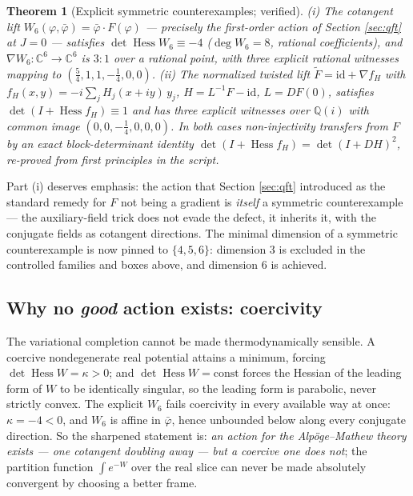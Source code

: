 \documentclass[11pt]{article}
\newtheorem{theorem}{Theorem}[section]
\theoremstyle{definition}
\theoremstyle{remark}
\newcommand{\C}{\mathbb{C}}
\newcommand{\Q}{\mathbb{Q}}
\begin{document}
\begin{theorem}[Explicit symmetric counterexamples; verified]
\label{thm:dim6}
\emph{(i)} The cotangent lift
$W_6(\varphi,\bar\varphi)=\bar\varphi\cdot F(\varphi)$ --- precisely
the first-order action of Section \ref{sec:qft} at $J=0$ --- satisfies
$\det\operatorname{Hess}W_6\equiv-4$ ($\deg W_6=8$, rational
coefficients), and $\nabla W_6:\C^6\to\C^6$ is $3{:}1$ over a rational
point, with three explicit rational witnesses mapping to
$(\tfrac54,1,1,-\tfrac14,0,0)$.
\emph{(ii)} The normalized twisted lift $\widetilde F=\mathrm{id}+\nabla
f_H$ with $f_H(x,y)=-i\sum_j H_j(x+iy)\,y_j$, $H=L^{-1}F-\mathrm{id}$,
$L=DF(0)$, satisfies $\det(I+\operatorname{Hess}f_H)\equiv1$ and has
three explicit witnesses over $\Q(i)$ with common image
$(0,0,-\tfrac14,0,0,0)$. In both cases non-injectivity transfers from
$F$ by an exact block-determinant identity
$\det(I+\operatorname{Hess}f_H)=\det(I+DH)^2$, re-proved from first
principles in the script.
\end{theorem}

Part (i) deserves emphasis: the action that Section \ref{sec:qft}
introduced as the standard remedy for $F$ not being a gradient is
\emph{itself} a symmetric counterexample --- the auxiliary-field trick
does not evade the defect, it inherits it, with the conjugate fields as
cotangent directions. The minimal dimension of a symmetric
counterexample is now pinned to $\{4,5,6\}$: dimension 3 is excluded in
the controlled families and boxes above, and dimension 6 is achieved.

\subsection{Why no \emph{good} action exists: coercivity}
\label{sec:coercive}

The variational completion cannot be made thermodynamically sensible.
A coercive nondegenerate real potential attains a minimum, forcing
$\det\operatorname{Hess}W=\kappa>0$; and $\det\operatorname{Hess}W=
\mathrm{const}$ forces the Hessian of the leading form of $W$ to be
identically singular, so the leading form is parabolic, never strictly
convex. The explicit $W_6$ fails coercivity in every available way at
once: $\kappa=-4<0$, and $W_6$ is affine in $\bar\varphi$, hence
unbounded below along every conjugate direction. So the sharpened
statement is: \emph{an action for the Alp\"oge--Mathew theory exists
--- one cotangent doubling away --- but a coercive one does not}; the
partition function $\int e^{-W}$ over the real slice can never be made
absolutely convergent by choosing a better frame.
\end{document}
